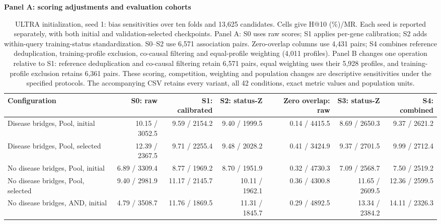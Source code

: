 \begin{landscape}
\begin{table}[p]
\centering\footnotesize
\setlength{\tabcolsep}{3pt}
\caption{ULTRA initialization, seed 1: bias sensitivities over ten folds and 13,625 candidates. Cells give H@10 (\%)/MR. Each seed is reported separately, with both initial and validation-selected checkpoints. Panel A: S0 uses raw scores; S1 applies per-gene calibration; S2 adds within-query training-status standardization. S0--S2 use 6,571 association pairs. Zero-overlap columns use 4,431 pairs; S4 combines reference deduplication, training-profile exclusion, co-causal filtering and equal-profile weighting (4,011 profiles). Panel B changes one operation relative to S1: reference deduplication and co-causal filtering retain 6,571 pairs, equal weighting uses their 5,928 profiles, and training-profile exclusion retains 6,361 pairs. These scoring, competition, weighting and population changes are descriptive sensitivities under the specified protocols. The accompanying CSV retains every variant, all 42 conditions, exact metric values and population units.}
\label{tab:controlled_bias_ultra-4g-seed1}
\textbf{Panel A: scoring adjustments and evaluation cohorts}\par\smallskip
\begin{adjustbox}{max width=\linewidth}
\begin{tabular}{lrrrrrr}
\toprule
Configuration & S0: raw & S1: calibrated & S2: status-Z & Zero overlap: raw & S3: status-Z & S4: combined \\
\midrule
Disease bridges, Pool, initial & 10.15 / 3052.5 & 9.59 / 2154.2 & 9.40 / 1999.5 & 0.14 / 4415.5 & 8.69 / 2650.3 & 9.37 / 2621.2 \\
Disease bridges, Pool, selected & 12.39 / 2367.5 & 9.71 / 2255.4 & 9.48 / 2028.2 & 0.41 / 3424.9 & 9.37 / 2701.5 & 9.99 / 2712.4 \\
No disease bridges, Pool, initial & 6.89 / 3309.4 & 8.77 / 1969.2 & 8.70 / 1951.9 & 0.32 / 4730.3 & 7.09 / 2568.7 & 7.50 / 2519.2 \\
No disease bridges, Pool, selected & 9.40 / 2981.9 & 11.17 / 2145.7 & 10.11 / 1962.1 & 0.36 / 4300.8 & 11.65 / 2609.5 & 12.36 / 2599.5 \\
No disease bridges, AND, initial & 4.79 / 3508.7 & 11.76 / 1869.5 & 11.31 / 1845.7 & 0.29 / 4892.5 & 13.34 / 2384.2 & 14.11 / 2326.3 \\

\end{tabular}
\end{adjustbox}
\end{table}
\end{landscape}
